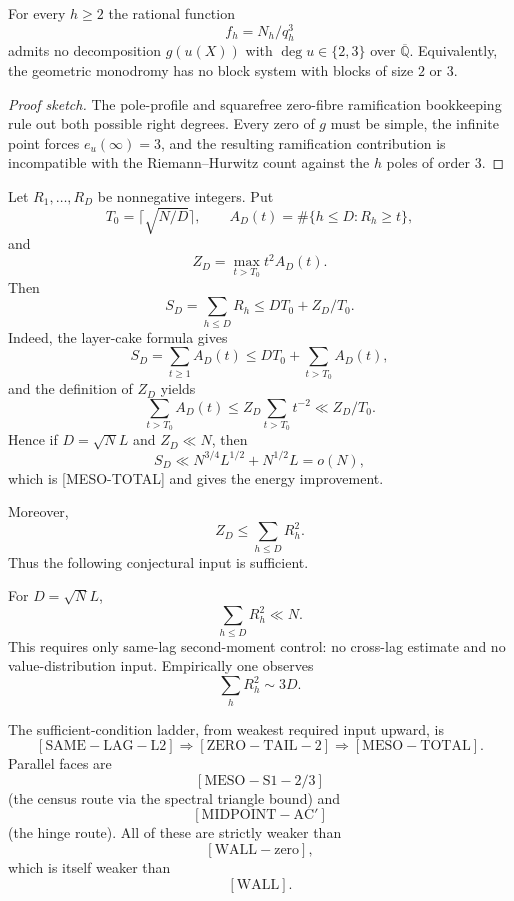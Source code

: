 \begin{theorem}\label{thm:no-right-23}
For every $h\geq 2$ the rational function
\[
f_h=N_h/q_h^3
\]
admits no decomposition $g(u(X))$ with $\deg u\in\{2,3\}$ over $\overline{\mathbb Q}$. Equivalently, the geometric monodromy has no block system with blocks of size $2$ or $3$.

\begin{proof}[Proof sketch]
The pole-profile and squarefree zero-fibre ramification bookkeeping rule out both possible right degrees. Every zero of $g$ must be simple, the infinite point forces $e_u(\infty)=3$, and the resulting ramification contribution is incompatible with the Riemann--Hurwitz count against the $h$ poles of order $3$.
\end{proof}
\end{theorem}

\begin{proposition}\label{prop:zero-tail-bridge}
Let $R_1,\ldots,R_D$ be nonnegative integers. Put
\[
T_0=\lceil\sqrt{N/D}\rceil,\qquad A_D(t)=\#\{h\leq D:R_h\geq t\},
\]
and
\[
Z_D=\max_{t>T_0}t^2A_D(t).
\]
Then
\[
S_D=\sum_{h\leq D}R_h\leq DT_0+Z_D/T_0.
\]
Indeed, the layer-cake formula gives
\[
S_D=\sum_{t\geq1}A_D(t)
\leq DT_0+\sum_{t>T_0}A_D(t),
\]
and the definition of $Z_D$ yields
\[
\sum_{t>T_0}A_D(t)\leq Z_D\sum_{t>T_0}t^{-2}\ll Z_D/T_0.
\]
Hence if $D=\sqrt N L$ and $Z_D\ll N$, then
\[
S_D\ll N^{3/4}L^{1/2}+N^{1/2}L=o(N),
\]
which is [MESO-TOTAL] and gives the energy improvement.

Moreover,
\[
Z_D\leq\sum_{h\leq D}R_h^2.
\]
Thus the following conjectural input is sufficient.
\end{proposition}

\begin{conjecture}\label{conj:same-lag-l2}
For $D=\sqrt N L$,
\[
\sum_{h\leq D}R_h^2\ll N.
\]
This requires only same-lag second-moment control: no cross-lag estimate and no value-distribution input. Empirically one observes
\[
\sum_h R_h^2\sim 3D.
\]
\end{conjecture}

\begin{remark}\label{rem:ladder-bottom}
The sufficient-condition ladder, from weakest required input upward, is
\[
[\mathrm{SAME\!\!\!-LAG\!\!\!-L2}]
\Longrightarrow
[\mathrm{ZERO\!\!\!-TAIL\!\!\!-2}]
\Longrightarrow
[\mathrm{MESO\!\!\!-TOTAL}].
\]
Parallel faces are
\[
[\mathrm{MESO\!\!\!-S1\!\!\!-2/3}]
\]
(the census route via the spectral triangle bound) and
\[
[\mathrm{MIDPOINT\!\!\!-AC'}]
\]
(the hinge route). All of these are strictly weaker than
\[
[\mathrm{WALL\!\!\!-zero}],
\]
which is itself weaker than
\[
[\mathrm{WALL}].
\]
\end{remark}
